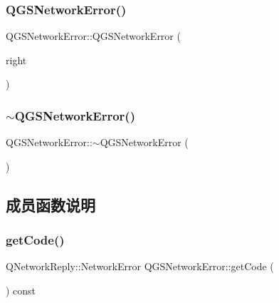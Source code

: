 \subsubsection{\texorpdfstring{Q\+G\+S\+Network\+Error()}{QGSNetworkError()}\hspace{0.1cm}{\footnotesize\ttfamily [3/3]}}
{\footnotesize\ttfamily Q\+G\+S\+Network\+Error\+::\+Q\+G\+S\+Network\+Error (\begin{DoxyParamCaption}\item[{\mbox{\hyperlink{class_q_g_s_network_error}{Q\+G\+S\+Network\+Error}} \&\&}]{right }\end{DoxyParamCaption})\hspace{0.3cm}{\ttfamily [default]}}

\mbox{\label{class_q_g_s_network_error_a7d80de1480757a12f058f357dc958bde}} 
\subsubsection{\texorpdfstring{$\sim$\+Q\+G\+S\+Network\+Error()}{~QGSNetworkError()}}
{\footnotesize\ttfamily Q\+G\+S\+Network\+Error\+::$\sim$\+Q\+G\+S\+Network\+Error (\begin{DoxyParamCaption}{ }\end{DoxyParamCaption})}



\subsection{成员函数说明}
\mbox{\label{class_q_g_s_network_error_a8a7776d6e6c78c8ed5bee49657e0c907}} 
\subsubsection{\texorpdfstring{get\+Code()}{getCode()}}
{\footnotesize\ttfamily Q\+Network\+Reply\+::\+Network\+Error Q\+G\+S\+Network\+Error\+::get\+Code (\begin{DoxyParamCaption}{ }\end{DoxyParamCaption}) const}

